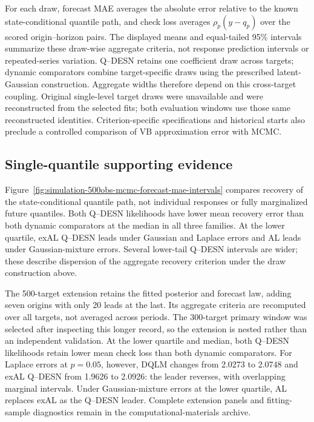 \documentclass[12pt,letterpaper]{article}
\numberwithin{suppalgorithm}{section}
\numberwithin{equation}{section}
\numberwithin{table}{section}
\numberwithin{figure}{section}
\begin{document}
For each draw, forecast MAE averages the absolute error relative to the
known state-conditional quantile path, and check loss averages
\(\rho_p(y-q_p)\) over the scored origin--horizon pairs. The displayed
means and equal-tailed 95\% intervals summarize these draw-wise aggregate
criteria, not response prediction intervals or repeated-series variation.
Q--DESN retains one coefficient draw across targets; dynamic comparators
combine target-specific draws using the prescribed latent-Gaussian
construction. Aggregate widths therefore depend on this cross-target
coupling. Original single-level target draws were unavailable and were
reconstructed from the selected fits; both evaluation windows use those
same reconstructed identities. Criterion-specific specifications and
historical starts also preclude a controlled comparison of VB approximation
error with MCMC.

\subsection{Single-quantile supporting evidence}
\label{subsec:supp-independent-forecast-recovery}
\label{subsec:supp-independent-evaluation-sensitivity}
\label{subsec:supp-independent-calibration}

Figure~\ref{fig:simulation-500obs-mcmc-forecast-mae-intervals} compares
recovery of the state-conditional quantile path, not individual responses
or fully marginalized future quantiles. Both Q--DESN likelihoods have
lower mean recovery error than both dynamic comparators at the median in
all three families. At the lower quartile, exAL Q--DESN leads under
Gaussian and Laplace errors and AL leads under Gaussian-mixture errors.
Several lower-tail Q--DESN intervals are wider; these describe dispersion
of the aggregate recovery criterion under the draw construction above.



The 500-target extension retains the fitted posterior and forecast law,
adding seven origins with only 20 leads at the last. Its aggregate
criteria are recomputed over all targets, not averaged across periods.
The 300-target primary window was selected after inspecting this longer
record, so the extension is nested rather than an independent validation.
At the lower quartile and median, both Q--DESN likelihoods retain lower
mean check loss than both dynamic comparators. For Laplace errors at
\(p=0.05\), however, DQLM changes from 2.0273 to 2.0748 and exAL
Q--DESN from 1.9626 to 2.0926: the leader reverses, with overlapping
marginal intervals. Under Gaussian-mixture errors at the lower quartile,
AL replaces exAL as the Q--DESN leader. Complete extension panels and
fitting-sample diagnostics remain in the computational-materials archive.
\end{document}
